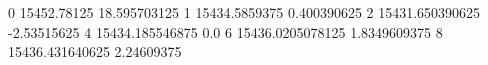 0 15452.78125 18.595703125
1 15434.5859375 0.400390625
2 15431.650390625 -2.53515625
4 15434.185546875 0.0
6 15436.0205078125 1.8349609375
8 15436.431640625 2.24609375
